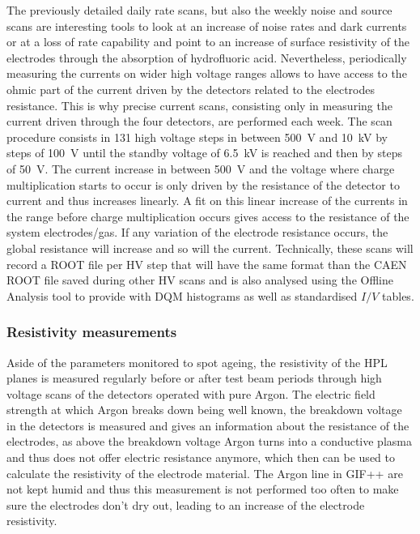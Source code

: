 	The previously detailed daily rate scans, but also the weekly noise and source scans are interesting tools to look at an increase of noise rates and dark currents or at a loss of rate capability and point to an increase of surface resistivity of the electrodes through the absorption of hydrofluoric acid. Nevertheless, periodically measuring the currents on wider high voltage ranges allows to have access to the ohmic part of the current driven by the detectors related to the electrodes resistance. This is why precise current scans, consisting only in measuring the current driven through the four detectors, are performed each week. The scan procedure consists in 131 high voltage steps in between \SI{500}{V} and \SI{10}{kV} by steps of \SI{100}{V} until the standby voltage of \SI{6.5}{kV} is reached and then by steps of \SI{50}{V}. The current increase in between \SI{500}{V} and the voltage where charge multiplication starts to occur is only driven by the resistance of the detector to current and thus increases linearly. A fit on this linear increase of the currents in the range before charge multiplication occurs gives access to the resistance of the system electrodes/gas. If any variation of the electrode resistance occurs, the global resistance will increase and so will the current. Technically, these scans will record a ROOT file per HV step that will have the same format than the CAEN ROOT file saved during other HV scans and is also analysed using the Offline Analysis tool to provide with DQM histograms as well as standardised $I/V$ tables.
	
		\subsubsection{Resistivity measurements}
		\label{chapt5:sssec:resistivity}
	
	Aside of the parameters monitored to spot ageing, the resistivity of the HPL planes is measured regularly before or after test beam periods through high voltage scans of the detectors operated with pure Argon. The electric field strength at which Argon breaks down being well known, the breakdown voltage in the detectors is measured and gives an information about the resistance of the electrodes, as above the breakdown voltage Argon turns into a conductive plasma and thus does not offer electric resistance anymore, which then can be used to calculate the resistivity of the electrode material. The Argon line in GIF++ are not kept humid and thus this measurement is not performed too often to make sure the electrodes don't dry out, leading to an increase of the electrode resistivity.
	
